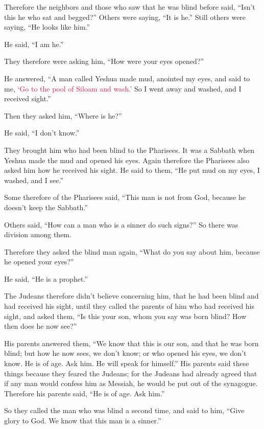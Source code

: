 \myverse{}Therefore the neighbors and those who saw that he was blind before
said, “Isn’t this he who sat and begged?”
\myverse{}Others were saying, “It is he.” Still others were saying, “He looks like him.”

He said, “I am he.”

\myverse{}They therefore were asking him, “How were your eyes opened?”

\myverse{}He answered, “A man called Yeshua made mud, anointed my eyes,
and said to me,
\textcolor{crimson}{‘Go to the pool of Siloam and wash.’} So I went away and washed, and I received sight.”

\myverse{}Then they asked him, “Where is he?”

He said, “I don’t know.”

\myverse{}They brought him who had been blind to the Pharisees.
\myverse{}It was a Sabbath when Yeshua made the mud and opened his eyes.
\myverse{}Again therefore the Pharisees also asked him how he received his sight. He
said to them, “He put mud on my eyes, I washed, and I see.”

\myverse{}Some therefore of the Pharisees said, “This man is not from God,
because he doesn’t keep the Sabbath.”

Others said, “How can a man who is a sinner do such signs?” So there was division among them.

\myverse{}Therefore they asked the blind man again, “What do you say about
him, because he opened your eyes?”

He said, “He is a prophet.”

\myverse{}The Judeans therefore didn’t believe concerning him, that he
had been blind and had received his sight, until they called the parents of him who had received his sight,
\myverse{}and asked them, “Is this your son, whom you say was born blind? How then does
he now see?”

\myverse{}His parents answered them, “We know that this is our son, and
that he was born blind;
\myverse{}but how he now sees, we don’t know; or who opened his eyes, we don’t know.
He is of age. Ask him. He will speak for himself.”
\myverse{}His parents said these things because they feared the Judeans; for the Judeans had already
agreed that if any man would confess him as Messiah, he would be put out of the synagogue.
\myverse{}Therefore his parents said, “He is of age. Ask him.”

\myverse{}So they called the man who was blind a second time, and said
to him, “Give glory to God. We know that this man is a sinner.”

